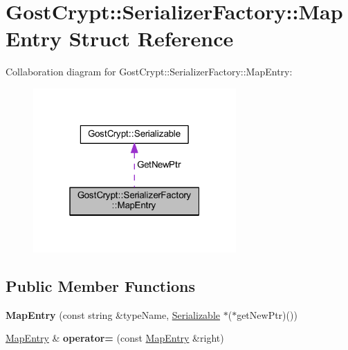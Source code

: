 \hypertarget{struct_gost_crypt_1_1_serializer_factory_1_1_map_entry}{}\section{Gost\+Crypt\+:\+:Serializer\+Factory\+:\+:Map\+Entry Struct Reference}
\label{struct_gost_crypt_1_1_serializer_factory_1_1_map_entry}


Collaboration diagram for Gost\+Crypt\+:\+:Serializer\+Factory\+:\+:Map\+Entry\+:
\nopagebreak
\begin{figure}[H]
\begin{center}
\leavevmode
\includegraphics[width=220pt]{struct_gost_crypt_1_1_serializer_factory_1_1_map_entry__coll__graph}
\end{center}
\end{figure}
\subsection*{Public Member Functions}
\begin{DoxyCompactItemize}
\item 
\mbox{\label{struct_gost_crypt_1_1_serializer_factory_1_1_map_entry_afb832e2af46ea856e2a06d5343b22041}} 
{\bfseries Map\+Entry} (const string \&type\+Name, \hyperlink{class_gost_crypt_1_1_serializable}{Serializable} $\ast$($\ast$get\+New\+Ptr)())
\item 
\mbox{\label{struct_gost_crypt_1_1_serializer_factory_1_1_map_entry_a4883e51b9a33d769bd3bb49b04153b78}} 
\hyperlink{struct_gost_crypt_1_1_serializer_factory_1_1_map_entry}{Map\+Entry} \& {\bfseries operator=} (const \hyperlink{struct_gost_crypt_1_1_serializer_factory_1_1_map_entry}{Map\+Entry} \&right)
\end{DoxyCompactItemize}
